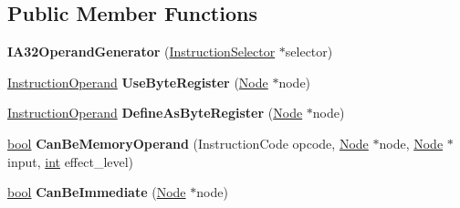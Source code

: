 \subsection*{Public Member Functions}
\begin{DoxyCompactItemize}
\item 
\mbox{\label{classv8_1_1internal_1_1compiler_1_1IA32OperandGenerator_a6fff7bcfa121c5543bf9b7604e252076}} 
{\bfseries I\+A32\+Operand\+Generator} (\mbox{\hyperlink{classv8_1_1internal_1_1compiler_1_1InstructionSelector}{Instruction\+Selector}} $\ast$selector)
\item 
\mbox{\label{classv8_1_1internal_1_1compiler_1_1IA32OperandGenerator_a8ac51b97395c248148a7b4edbc904301}} 
\mbox{\hyperlink{classv8_1_1internal_1_1compiler_1_1InstructionOperand}{Instruction\+Operand}} {\bfseries Use\+Byte\+Register} (\mbox{\hyperlink{classv8_1_1internal_1_1compiler_1_1Node}{Node}} $\ast$node)
\item 
\mbox{\label{classv8_1_1internal_1_1compiler_1_1IA32OperandGenerator_aad6f1c6d7915b721399695edd9e84db1}} 
\mbox{\hyperlink{classv8_1_1internal_1_1compiler_1_1InstructionOperand}{Instruction\+Operand}} {\bfseries Define\+As\+Byte\+Register} (\mbox{\hyperlink{classv8_1_1internal_1_1compiler_1_1Node}{Node}} $\ast$node)
\item 
\mbox{\label{classv8_1_1internal_1_1compiler_1_1IA32OperandGenerator_a074166832aff6265ed2e5a5df74d23c9}} 
\mbox{\hyperlink{classbool}{bool}} {\bfseries Can\+Be\+Memory\+Operand} (Instruction\+Code opcode, \mbox{\hyperlink{classv8_1_1internal_1_1compiler_1_1Node}{Node}} $\ast$node, \mbox{\hyperlink{classv8_1_1internal_1_1compiler_1_1Node}{Node}} $\ast$input, \mbox{\hyperlink{classint}{int}} effect\+\_\+level)
\item 
\mbox{\label{classv8_1_1internal_1_1compiler_1_1IA32OperandGenerator_a55efece469da2ec5e39f1ab2fb8aecf1}} 
\mbox{\hyperlink{classbool}{bool}} {\bfseries Can\+Be\+Immediate} (\mbox{\hyperlink{classv8_1_1internal_1_1compiler_1_1Node}{Node}} $\ast$node)
\item 

\end{DoxyCompactItemize}
